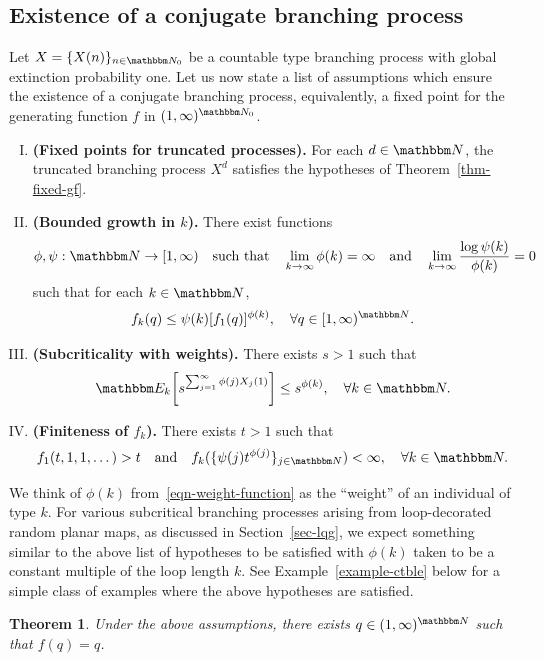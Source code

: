 \documentclass[11pt]{article}
\theoremstyle{plain}
\newtheorem{thm}{Theorem}[section]
\theoremstyle{definition}
\numberwithin{equation}{section}
\newcommand{\eqb}{\begin{equation}}
\newcommand{\eqe}{\end{equation}}
\newcommand{\eqbn}{\begin{equation*}}
\newcommand{\eqen}{\end{equation*}}
\newcommand{\BB}{\mathbbm}
\let\originalleft\left
\let\originalright\right
\renewcommand{\left}{\mathopen{}\mathclose\bgroup\originalleft}
\renewcommand{\right}{\aftergroup\egroup\originalright}
\begin{document}
\subsection{Existence of a conjugate branching process} 

 
Let $X = \{X(n)\}_{n\in\BB N_0}$ be a countable type branching process with global extinction probability one. 
Let us now state a list of assumptions which ensure the existence of a conjugate branching process, equivalently, a fixed point for the generating function $f$ in $(1,\infty)^{\BB N_0}$.
\begin{enumerate}[I.] 
\item \textbf{(Fixed points for truncated processes).} For each $d\in\BB N$, the truncated branching process $X^d$ satisfies the hypotheses of Theorem~\ref{thm-fixed-gf}. \label{item-gf-trunc-infty} 
\item \textbf{(Bounded growth in $k$).} There exist functions
\eqb \label{eqn-weight-function}
\phi , \psi : \BB N \to [1,\infty) \quad \text{such that} 
\quad \lim_{k \to\infty} \phi(k) = \infty \quad \text{and} \quad 
\lim_{k\to\infty} \frac{ \log\psi(k)}{ \phi(k) } = 0
\eqe
such that for each $k\in\BB N$, \label{item-gf-growth-infty}
\eqb
f_k(q) \leq \psi(k) [f_1(q)]^{\phi(k)} ,\quad\forall q \in [1,\infty)^{\BB N}.
\eqe
\item \textbf{(Subcriticality with weights).} There exists $s > 1$ such that \label{item-gf-bded-infty}
\eqbn
\BB E_k\left[ s^{\sum_{j=1}^\infty \phi(j) X_j(1)} \right] \leq s^{\phi(k)} , \quad \forall k \in \BB N . 
\eqen
\item \textbf{(Finiteness of $f_k$).} There exists $t > 1$ such that  \label{item-gf-perturb-infty} 
\eqbn
f_1(t,1,1,\dots) > t \quad \text{and} \quad
f_k( \{\psi(j) t^{\phi(j)}\}_{j \in \BB N} )  < \infty , \quad \forall k \in \BB N. 
\eqen  
\end{enumerate}
We think of $\phi(k)$ from~\eqref{eqn-weight-function} as the ``weight'' of an individual of type $k$. 
For various subcritical branching processes arising from loop-decorated random planar maps, as discussed in Section~\ref{sec-lqg}, we expect something similar to the above list of hypotheses to be satisfied with $\phi(k)$ taken to be a constant multiple of the loop length $k$. See Example~\ref{example-ctble} below for a simple class of examples where the above hypotheses are satisfied. 
 
\begin{thm} \label{thm-fixed-pt-infty}
Under the above assumptions, there exists $q \in (1,\infty)^{\BB N }$ such that $f(q) = q$.
\end{thm}
\end{document}

